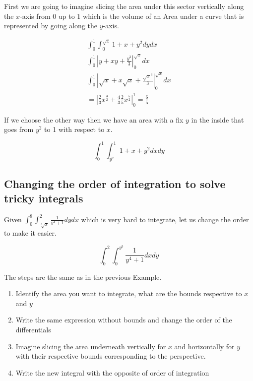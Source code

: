 First we are going to imagine slicing the area under this sector vertically along the \(x\)-axis from 
\(0\) up to \(1\) which is the volume of an Area under a curve that is represented by going along the 
\(y\)-axis.

\begin{align*}
    \int_{0}^{1}\int_{0}^{\sqrt{x}} 1 + x + y^2 dy dx \\
    \int_{0}^{1} \left| y + xy + \frac{y^3}{3} \right|_{0}^{\sqrt{x}} dx \\
    \int_{0}^{1} \left| \sqrt{x} + x\sqrt{x} + \frac{\sqrt{x}^3}{3} \right|_{0}^{\sqrt{x}} dx \\
    = \left| \frac{2}{3} x^{\frac{3}{2}} + \frac{4}{3} \frac{2}{5} x^{\frac{5}{2}} \right|_{0}^{1} = \frac{6}{5}
\end{align*}

If we choose the other way then we have an area with a fix \(y\) in the inside that goes from \(y^2\) to 
1 with respect to \(x\).

\[
    \int_{0}^{1}\int_{y^2}^{1} 1 + x + y^2 dx dy
\]

\subsection{Changing the order of integration to solve tricky integrals}

Given \(\int_{0}^{8}\int_{\sqrt[3]{x}}^{2} \frac{1}{y^4 +1}dy dx\) which is very hard to integrate, 
let us change the order to make it easier.

\[
    \int_{0}^{2}\int_{0}^{y^3} \frac{1}{y^4 +1}dx dy
\]

The steps are the same as in the previous Example.

\begin{enumerate}

    \item Identify the area you want to integrate, what are the bounds respective to \(x\) and \(y\)

    \item Write the same expression without bounds and change the order of the differentials

    \item Imagine slicing the area underneath vertically for \(x\) and horizontally for \(y\) with their 
          respective bounds corresponding to the perspective.

    \item Write the new integral with the opposite of order of integration

\end{enumerate}

